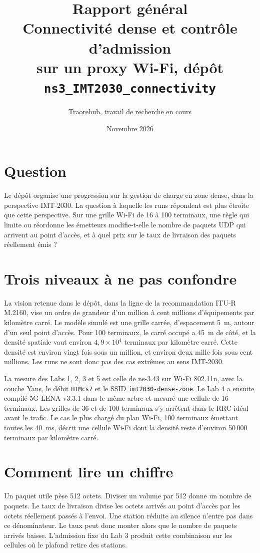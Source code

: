 \documentclass[11pt,a4paper]{article}
\title{Rapport général\\
\large Connectivité dense et contrôle d'admission\\
sur un proxy Wi-Fi, dépôt \texttt{ns3\_IMT2030\_connectivity}}
\author{Traorehub, travail de recherche en cours}
\date{Novembre 2026}
\begin{document}
\maketitle
\tableofcontents
\newpage

\section{Question}

Le dépôt organise une progression sur la gestion de charge en zone dense, dans la perspective IMT-2030. La question à laquelle les runs répondent est plus étroite que cette perspective. Sur une grille Wi-Fi de 16 à 100 terminaux, une règle qui limite ou réordonne les émetteurs modifie-t-elle le nombre de paquets UDP qui arrivent au point d'accès, et à quel prix sur le taux de livraison des paquets réellement émis ?

\section{Trois niveaux à ne pas confondre}

La vision retenue dans le dépôt, dans la ligne de la recommandation ITU-R M.2160, vise un ordre de grandeur d'un million à cent millions d'équipements par kilomètre carré. Le modèle simulé est une grille carrée, d'espacement 5~m, autour d'un seul point d'accès. Pour 100 terminaux, le carré occupé a 45~m de côté, et la densité spatiale vaut environ $4{,}9\times 10^{4}$ terminaux par kilomètre carré. Cette densité est environ vingt fois sous un million, et environ deux mille fois sous cent millions. Les runs ne sont donc pas des cas extrêmes au sens IMT-2030.

La mesure des Labs 1, 2, 3 et 5 est celle de ns-3.43 sur Wi-Fi 802.11n, avec la couche Yans, le débit \texttt{HtMcs7} et le SSID \texttt{imt2030-dense-zone}. Le Lab 4 a ensuite compilé 5G-LENA v3.3.1 dans le même arbre et mesuré une cellule de 16 terminaux. Les grilles de 36 et de 100 terminaux s'y arrêtent dans le RRC idéal avant le trafic. Le cas le plus chargé du plan Wi-Fi, 100 terminaux émettant toutes les 40~ms, décrit une cellule Wi-Fi dont la densité reste d'environ 50\,000 terminaux par kilomètre carré.

\section{Comment lire un chiffre}

Un paquet utile pèse 512 octets. Diviser un volume par 512 donne un nombre de paquets. Le taux de livraison divise les octets arrivés au point d'accès par les octets réellement passés à l'envoi. Une station réduite au silence n'entre pas dans ce dénominateur. Le taux peut donc monter alors que le nombre de paquets arrivés baisse. L'admission fixe du Lab 3 produit cette combinaison sur les cellules où le plafond retire des stations.
\end{document}
